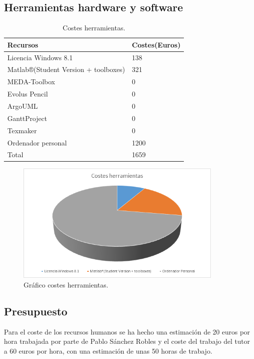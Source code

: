 \subsection{Herramientas hardware y software}
\begin{table}[htb]
\begin{center}
\begin{tabular}{|l|l|}
\hline
Recursos & Costes(Euros) \\
\hline \hline
Licencia Windows 8.1 & 138 \\ \hline
Matlab®(Student Version + toolboxes) & 321 \\ \hline
MEDA-Toolbox & 0 \\ \hline
Evolus Pencil & 0 \\ \hline
ArgoUML & 0 \\ \hline
GanttProject & 0 \\ \hline
Texmaker & 0 \\ \hline
Ordenador personal & 1200 \\ \hline
Total & 1659 \\ \hline
\end{tabular}
\caption{Costes herramientas.}
\end{center}
\end{table}

\bigskip
\begin{figure}[H]
\centering
\includegraphics[width=0.9\textwidth]{imagenes/figuras/5_3.png}
\caption{Gráfico costes herramientas.}
\end{figure}
\bigskip

\subsection{Presupuesto}
Para el coste de los recursos humanos se ha hecho una estimación de 20 euros por hora trabajada por parte de Pablo Sánchez Robles y el coste del trabajo del tutor a 60 euros por hora, con una estimación de unas 50 horas de trabajo.

